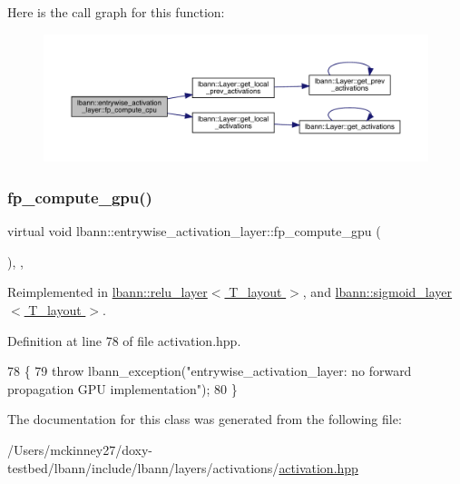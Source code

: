 Here is the call graph for this function\+:\nopagebreak
\begin{figure}[H]
\begin{center}
\leavevmode
\includegraphics[width=350pt]{classlbann_1_1entrywise__activation__layer_a8d4b0376b9783414c1cb7812351122ce_cgraph}
\end{center}
\end{figure}
\mbox{\label{classlbann_1_1entrywise__activation__layer_aeb270dda0c2ec95dd34c35e1e8300f11}} 
\subsubsection{\texorpdfstring{fp\+\_\+compute\+\_\+gpu()}{fp\_compute\_gpu()}}
{\footnotesize\ttfamily virtual void lbann\+::entrywise\+\_\+activation\+\_\+layer\+::fp\+\_\+compute\+\_\+gpu (\begin{DoxyParamCaption}{ }\end{DoxyParamCaption})\hspace{0.3cm}{\ttfamily [inline]}, {\ttfamily [protected]}, {\ttfamily [virtual]}}



Reimplemented in \hyperlink{classlbann_1_1relu__layer_a682fbf36187cb7f985581b5d4095ae14}{lbann\+::relu\+\_\+layer$<$ T\+\_\+layout $>$}, and \hyperlink{classlbann_1_1sigmoid__layer_a1a2c1a56ca20677d4278a5787fa7fc86}{lbann\+::sigmoid\+\_\+layer$<$ T\+\_\+layout $>$}.



Definition at line 78 of file activation.\+hpp.


\begin{DoxyCode}
78                                 \{
79     \textcolor{keywordflow}{throw} lbann\_exception(\textcolor{stringliteral}{"entrywise\_activation\_layer: no forward propagation GPU implementation"});
80   \}
\end{DoxyCode}


The documentation for this class was generated from the following file\+:\begin{DoxyCompactItemize}
\item 
/\+Users/mckinney27/doxy-\/testbed/lbann/include/lbann/layers/activations/\hyperlink{activation_8hpp}{activation.\+hpp}\end{DoxyCompactItemize}
